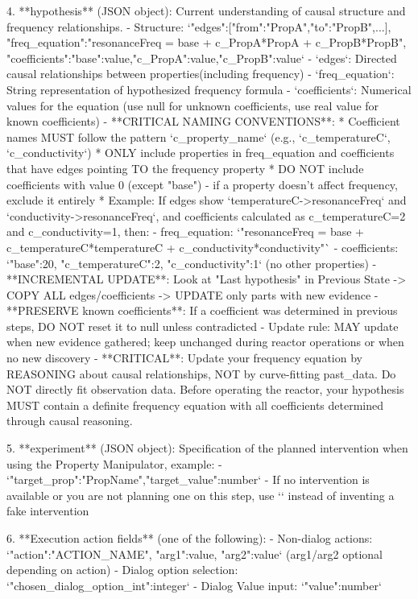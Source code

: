 \begin{tcblisting}
4. **hypothesis** (JSON object): Current understanding of causal structure and frequency relationships.
   - Structure: `{"edges":[{"from":"PropA","to":"PropB"},...], "freq_equation":"resonanceFreq = base + c_PropA*PropA + c_PropB*PropB", "coefficients":{"base":value,"c_PropA":value,"c_PropB":value}}`
   - `edges`: Directed causal relationships between properties(including frequency)
   - `freq_equation`: String representation of hypothesized frequency formula
   - `coefficients`: Numerical values for the equation (use null for unknown coefficients, use real value for known coefficients)
   - **CRITICAL NAMING CONVENTIONS**:
     * Coefficient names MUST follow the pattern `c_{property_name}` (e.g., `c_temperatureC`, `c_conductivity`)
     * ONLY include properties in freq_equation and coefficients that have edges pointing TO the frequency property
     * DO NOT include coefficients with value 0 (except "base") - if a property doesn't affect frequency, exclude it entirely
     * Example: If edges show `temperatureC->resonanceFreq` and `conductivity->resonanceFreq`, and coefficients calculated as c_temperatureC=2 and c_conductivity=1, then:
       - freq_equation: `"resonanceFreq = base + c_temperatureC*temperatureC + c_conductivity*conductivity"`
       - coefficients: `{"base":20, "c_temperatureC":2, "c_conductivity":1}` (no other properties)
   - **INCREMENTAL UPDATE**: Look at "Last hypothesis" in Previous State -> COPY ALL edges/coefficients -> UPDATE only parts with new evidence
   - **PRESERVE known coefficients**: If a coefficient was determined in previous steps, DO NOT reset it to null unless contradicted
   - Update rule: MAY update when new evidence gathered; keep unchanged during reactor operations or when no new discovery
   - **CRITICAL**: Update your frequency equation by REASONING about causal relationships, NOT by curve-fitting past_data. Do NOT directly fit observation data. Before operating the reactor, your hypothesis MUST contain a definite frequency equation with all coefficients determined through causal reasoning.

5. **experiment** (JSON object): Specification of the planned intervention when using the Property Manipulator, example:
   - `{"target_prop":"PropName","target_value":number}`
   - If no intervention is available or you are not planning one on this step, use `{}` instead of inventing a fake intervention

6. **Execution action fields** (one of the following):
   - Non-dialog actions: `"action":"ACTION_NAME", "arg1":value, "arg2":value` (arg1/arg2 optional depending on action)
   - Dialog option selection: `"chosen_dialog_option_int":integer`
   - Dialog Value input: `"value":number`


\end{tcblisting}

